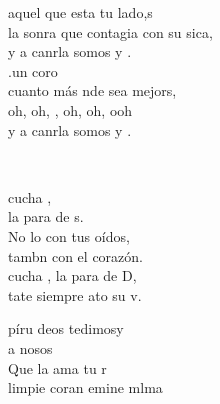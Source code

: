 \documentclass[12pt]{article}
\begin{document}
\begin{multicols*}{2}
\begin{cancion}[Es tu amigo es][Kairoi]
\begin{chorus}
	aquel que esta tu lado,s \\
	la sonra que contagia con su sica,\\
	y a canrla somos  y .\\
	.un coro  \\
	cuanto más nde sea mejors, \\
	oh, oh, , oh, oh,  ooh \\
	y a canrla somos  y .  \\
	\end{chorus}%
	\jump\\
\end{cancion}%

\begin{cancion}[Escucha tú][Xaquín]%
	cucha , \\
	la para de s.\\
	No lo con tus oídos, \\
	tambn con el corazón. \\
	cucha , la para de D, \\
	tate siempre ato su v.\\
\end{cancion}%

\begin{cancion}%
	píru deos tedimosy\\
	a nosos\\
	Que la ama  tu r\\
	limpie coran emine mlma\\
\end{cancion}%


\end{multicols*}
\end{document}
